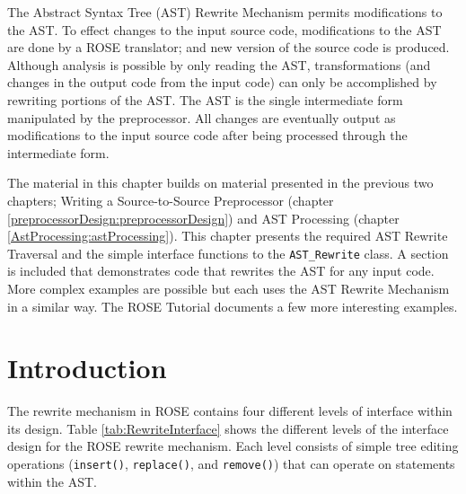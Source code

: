 
   The Abstract Syntax Tree (AST) Rewrite Mechanism permits modifications 
to the AST.  To effect changes to the input source code, modifications to the 
AST are done by a ROSE translator; and new version of the source code is produced.
Although analysis is possible by only reading the AST, transformations (and changes in the
output code from the input code) can only be accomplished by rewriting portions of the AST.
The AST is the single intermediate form manipulated by the preprocessor.  All changes
are eventually output as modifications to the input source code after being processed
through the intermediate form.


   The material in this chapter builds on material presented in the previous two
chapters; Writing a Source-to-Source Preprocessor (chapter 
\ref{preprocessorDesign:preprocessorDesign}) and AST Processing 
(chapter \ref{AstProcessing:astProcessing}). This chapter presents the required
AST Rewrite Traversal and the simple interface functions to the {\tt AST\_Rewrite} class.  
A section is included that 
demonstrates code that rewrites the AST for any input code. More complex examples are
possible but each uses the AST Rewrite Mechanism in a similar way.  The ROSE Tutorial 
documents a few more interesting examples.%

\section{Introduction}

   The rewrite mechanism in ROSE contains four different levels of interface
within its design.  Table \ref{tab:RewriteInterface} shows the different levels of
the interface design for the ROSE rewrite mechanism.  Each level consists of
simple tree editing operations ({\tt insert()}, {\tt replace()}, and 
{\tt remove()}) that can operate on statements within the AST.

